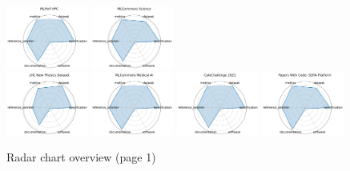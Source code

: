 \documentclass{article}
\begin{document}
\begin{figure}[ht!]
\includegraphics[width=0.2400\textwidth]{MLPerf HPC_radar.pdf}
\includegraphics[width=0.2400\textwidth]{MLCommons Science_radar.pdf}
\\[1ex]
\includegraphics[width=0.2400\textwidth]{LHC New Physics Dataset_radar.pdf}
\includegraphics[width=0.2400\textwidth]{MLCommons Medical AI_radar.pdf}
\includegraphics[width=0.2400\textwidth]{CaloChallenge 2022_radar.pdf}
\includegraphics[width=0.2400\textwidth]{Papers With Code- SOTA Platform_radar.pdf}
\\[1ex]
\caption{Radar chart overview (page 1)}
\end{figure}


\clearpage
\end{document}
